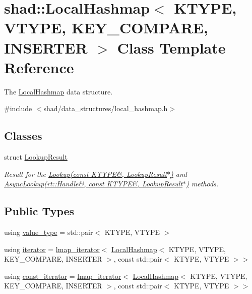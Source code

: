 \hypertarget{classshad_1_1LocalHashmap}{\section{shad\-:\-:Local\-Hashmap$<$ K\-T\-Y\-P\-E, V\-T\-Y\-P\-E, K\-E\-Y\-\_\-\-C\-O\-M\-P\-A\-R\-E, I\-N\-S\-E\-R\-T\-E\-R $>$ Class Template Reference}
\label{classshad_1_1LocalHashmap}
}


The \hyperlink{classshad_1_1LocalHashmap}{Local\-Hashmap} data structure.  




{\ttfamily \#include $<$shad/data\-\_\-structures/local\-\_\-hashmap.\-h$>$}

\subsection*{Classes}
\begin{DoxyCompactItemize}
\item 
struct \hyperlink{structshad_1_1LocalHashmap_1_1LookupResult}{Lookup\-Result}
\begin{DoxyCompactList}\small\item\em Result for the \hyperlink{classshad_1_1LocalHashmap_a9bd1b3780c1c676ce8d5eae265030080}{Lookup(const K\-T\-Y\-P\-E\&, Lookup\-Result$\ast$)} and \hyperlink{classshad_1_1LocalHashmap_a0328e22adb5dd53e819cc1791e802a56}{Async\-Lookup(rt\-::\-Handle\&, const K\-T\-Y\-P\-E\&, Lookup\-Result$\ast$)} methods. \end{DoxyCompactList}\end{DoxyCompactItemize}
\subsection*{Public Types}
\begin{DoxyCompactItemize}
\item 
using \hyperlink{classshad_1_1LocalHashmap_a3fa27c320a046745e01804325f15dd0e}{value\-\_\-type} = std\-::pair$<$ K\-T\-Y\-P\-E, V\-T\-Y\-P\-E $>$
\item 
using \hyperlink{classshad_1_1LocalHashmap_aafdf55e8d9fa4799bcef4881baf25a71}{iterator} = \hyperlink{classshad_1_1lmap__iterator}{lmap\-\_\-iterator}$<$ \hyperlink{classshad_1_1LocalHashmap}{Local\-Hashmap}$<$ K\-T\-Y\-P\-E, V\-T\-Y\-P\-E, K\-E\-Y\-\_\-\-C\-O\-M\-P\-A\-R\-E, I\-N\-S\-E\-R\-T\-E\-R $>$, const std\-::pair$<$ K\-T\-Y\-P\-E, V\-T\-Y\-P\-E $>$$>$
\item 
using \hyperlink{classshad_1_1LocalHashmap_ad5e054bdbc20f161cd8df8e00c525401}{const\-\_\-iterator} = \hyperlink{classshad_1_1lmap__iterator}{lmap\-\_\-iterator}$<$ \hyperlink{classshad_1_1LocalHashmap}{Local\-Hashmap}$<$ K\-T\-Y\-P\-E, V\-T\-Y\-P\-E, K\-E\-Y\-\_\-\-C\-O\-M\-P\-A\-R\-E, I\-N\-S\-E\-R\-T\-E\-R $>$, const std\-::pair$<$ K\-T\-Y\-P\-E, V\-T\-Y\-P\-E $>$$>$
\end{DoxyCompactItemize}
